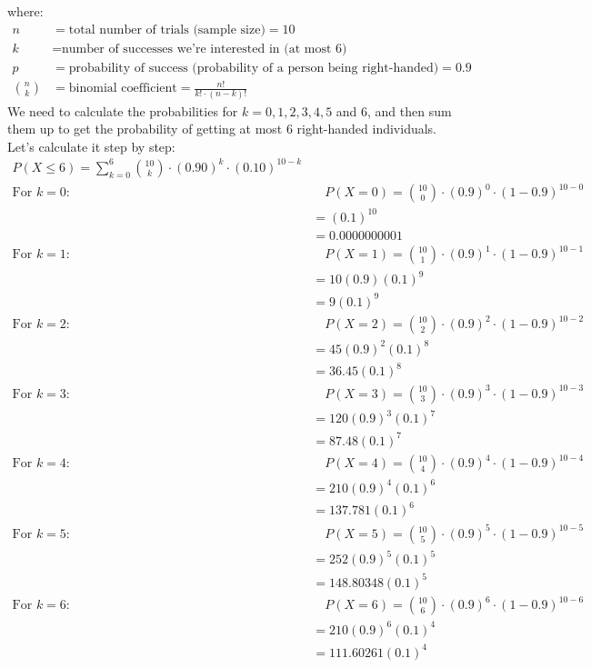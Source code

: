 \documentclass[journal,12pt,onecolumn]{IEEEtran}
\theoremstyle{remark}
\begin{document}
where:
\begin{align}
n & = \text{total number of trials (sample size)} = 10 \\
k & = \text{number of successes we're interested in (at most 6)} \\
p & = \text{probability of success (probability of a person being right-handed)} = 0.9 \\
\binom{n}{k} & = \text{binomial coefficient} = \frac{n!}{k! \cdot (n - k)!}
\end{align}
We need to calculate the probabilities for $ k = 0, 1, 2, 3, 4, 5 $ and $6$, and then sum them up to get the probability of getting at most 6 right-handed individuals.
Let's calculate it step by step:\\
\begin{align}
P(X \leq 6) = \sum_{k=0}^{6} \binom{10}{k} \cdot (0.90)^k \cdot (0.10)^{10 - k}\\
\text{For } k = 0: & \quad P(X = 0)=\binom{10}{0} \cdot (0.9)^0 \cdot (1 - 0.9)^{10 - 0} \\
                                   &=(0.1)^{10} \\
                                   &=0.0000000001\\                             
\text{For } k = 1: & \quad P(X = 1)= \binom{10}{1} \cdot (0.9)^1 \cdot (1 - 0.9)^{10 - 1} \\
&=10(0.9)(0.1)^{9} \\
&=9(0.1)^{9}       \\                            
\text{For } k = 2: & \quad P(X = 2)= \binom{10}{2} \cdot (0.9)^2 \cdot (1 - 0.9)^{10 - 2} \\
&=45(0.9)^{2}(0.1)^{8}\\
&=36.45(0.1)^{8}\\
\text{For } k = 3: & \quad P(X = 3)= \binom{10}{3} \cdot (0.9)^3 \cdot (1 - 0.9)^{10 - 3} \\
&=120(0.9)^{3}(0.1)^{7}\\
&=87.48(0.1)^{7}\\
\text{For } k = 4: & \quad P(X = 4)= \binom{10}{4} \cdot (0.9)^4 \cdot (1 - 0.9)^{10 - 4} \\
&=210(0.9)^{4}(0.1)^{6}\\
&=137.781(0.1)^{6}\\
\text{For } k = 5: & \quad P(X = 5)= \binom{10}{5} \cdot (0.9)^5 \cdot (1 - 0.9)^{10 - 5} \\
&=252(0.9)^{5}(0.1)^{5}\\
&=148.80348(0.1)^{5}\\
\text{For } k = 6: & \quad P(X = 6)= \binom{10}{6} \cdot (0.9)^6 \cdot (1 - 0.9)^{10 - 6}\\
&=210(0.9)^{6}(0.1)^{4}\\
&=111.60261(0.1)^{4}
\end{align}
\end{document}
